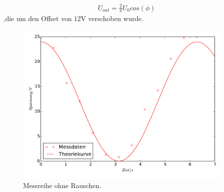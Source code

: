 \begin{align*}
U_{out}=\frac{2}{\pi}U_0cos(\phi)
\end{align*}
,die um den Offset von $12\si{\volt}$ verschoben wurde.
\begin{figure}
  \centering
  \includegraphics[height=8cm]{or_signal.pdf}
  \caption{Messreihe ohne Rauschen.}
  \label{fig:Mor}
\end{figure}






